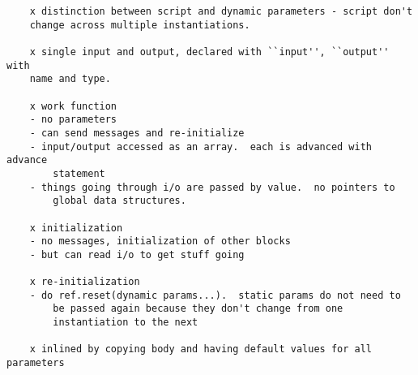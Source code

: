 \documentclass[draft]{article}
\begin{document}
\begin{verbatim}
    x distinction between script and dynamic parameters - script don't
	change across multiple instantiations.

    x single input and output, declared with ``input'', ``output'' with
	name and type.

    x work function
	- no parameters
	- can send messages and re-initialize
	- input/output accessed as an array.  each is advanced with advance
		statement
	- things going through i/o are passed by value.  no pointers to 
		global data structures.

    x initialization
	- no messages, initialization of other blocks
	- but can read i/o to get stuff going

    x re-initialization
	- do ref.reset(dynamic params...).  static params do not need to
		be passed again because they don't change from one 
		instantiation to the next

    x inlined by copying body and having default values for all parameters

\end{verbatim}
\end{document}
